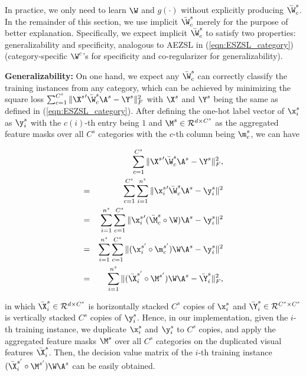 \documentclass[journal]{IEEEtran}
\begin{document}
In practice, we only need to learn $\W$ and $g(\cdot)$ without explicitly producing $\bar{\W}_c^s$. In the remainder of this section, we use implicit $\bar{\W}_c^s$  merely for the purpose of better explanation. Specifically, we expect implicit $\bar{\W}_c^s$ to satisfy two properties: generalizability and specificity, analogous to AEZSL in (\ref{eqn:ESZSL_category}) (category-specific $\W^c$'s for specificity and co-regularizer for generalizability).

\noindent\textbf{Generalizability: }On one hand, we expect any $\bar{\W}_c^s$ can correctly classify the training instances from any category, which can be achieved by minimizing the square loss $\sum_{c=1}^{C^s}\|{\X^s}'\bar{\W}_c^s\A^s-\Y^s\|_F^2$ with $\X^s$ and $\Y^s$ being the same as defined in (\ref{eqn:ESZSL_category}).
After defining the one-hot label vector of $\x_i^s$ as $\y_i^s$ with the $c(i)$-th entry being $1$ and $\M^s\in\mathcal{R}^{d\times C^s}$ as the aggregated feature masks over all $C^s$ categories with the $c$-th column being $\m_c^s$, we can have

\vspace{-15pt}
\begin{eqnarray} \label{eqn:W_category_equal}
&&\sum_{c=1}^{C^s}\|{\X^s}'\bar{\W}_c^s\A^s-\Y^s\|_F^2,\\
=&&\sum_{c=1}^{C^s}\sum_{i=1}^{n^s} \|{\x_i^s}'\bar{\W}_c^s\A^s-\y_i^s\|^2\nonumber\\
= && \sum_{i=1}^{n^s}\sum_{c=1}^{C^s} \|{\x_i^s}' (\bar{\M}_c^s\circ\W)\A^s-\y_i^s\|^2\nonumber\\
= && \sum_{i=1}^{n^s}\sum_{c=1}^{C^s} \|(\x_i^{s'}\circ\m_c^{s'}) \W\A^s-\y_i^s\|^2\nonumber\\
= && \sum_{i=1}^{n^s}\|({\bar{\X}_i^{s'}}\circ \M^{s'})\W\A^s-\bar{\Y}_i^s\|_F^2,\nonumber
\end{eqnarray}
\vspace{-5pt}

\noindent in which $\bar{\X}_i^{s}\in\mathcal{R}^{d\times C^s}$ is horizontally stacked $C^s$ copies of $\x_i^s$ and $\bar{\Y}_i^s\in\mathcal{R}^{C^s\times C^s}$ is vertically stacked $C^s$ copies of $\y_i^s$. Hence, in our implementation, given the $i$-th training instance, we duplicate $\x_i^s$ and $\y_i^s$ to $C^s$
copies, and apply the aggregated feature masks $\M^s$ over all $C^s$ categories on the duplicated visual features $\bar{\X}_i^{s}$. Then, the decision value matrix of the $i$-th training instance $({\bar{\X}_i^{s'}}\circ \M^{s'})\W\A^s$ can be easily obtained.
\end{document}
